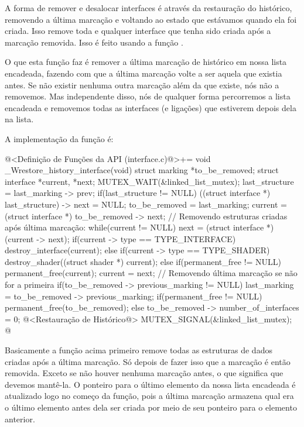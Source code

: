
A forma de remover e desalocar interfaces é através da restauração do
histórico, removendo a última marcação e voltando ao estado que
estávamos quando ela foi criada. Isso remove toda e qualquer interface
que tenha sido criada após a marcação removida. Isso é feito usando a
função
.

O que esta função faz é remover a última marcação de histórico em
nossa lista encadeada, fazendo com que a última marcação volte a ser
aquela que existia antes. Se não existir nenhuma outra marcação além
da que existe, nós não a removemos. Mas independente disso, nós de
qualquer forma percorremos a lista encadeada e removemos todas as
interfaces (e ligações) que estiverem depois dela na lista.

A implementação da função é:

\iniciocodigo
@<Definição de Funções da API (interface.c)@>+=
void _Wrestore_history_interface(void){
  struct marking *to_be_removed;
  struct interface *current, *next;
  MUTEX_WAIT(&linked_list_mutex);
  last_structure = last_marking -> prev;
  if(last_structure != NULL)
    ((struct interface *) last_structure) -> next = NULL;
  to_be_removed = last_marking;
  current = (struct interface *) to_be_removed -> next;
  // Removendo estruturas criadas após última marcação:
  while(current != NULL){
    next = (struct interface *) (current -> next);
    if(current -> type == TYPE_INTERFACE)
      destroy_interface(current);
    else if(current -> type == TYPE_SHADER)
      destroy_shader((struct shader *) current);
    else if(permanent_free != NULL)
      permanent_free(current);
    current = next;
  }
  // Removendo última marcação se não for a primeira
  if(to_be_removed -> previous_marking != NULL){
    last_marking = to_be_removed -> previous_marking;
    if(permanent_free != NULL)
      permanent_free(to_be_removed);
  }
  else
    to_be_removed -> number_of_interfaces = 0;
  @<Restauração de Histórico@>
  MUTEX_SIGNAL(&linked_list_mutex);
}
@
\fimcodigo

Basicamente a função acima primeiro remove todas as estruturas de
dados criadas após a última marcação. Só depois de fazer isso que a
marcação é então removida. Exceto se não houver nenhuma marcação
antes, o que significa que devemos mantê-la. O ponteiro para o último
elemento da nossa lista encadeada é atualizado logo no começo da
função, pois a última marcação armazena qual era o último elemento
antes dela ser criada por meio de seu ponteiro para o elemento
anterior.

